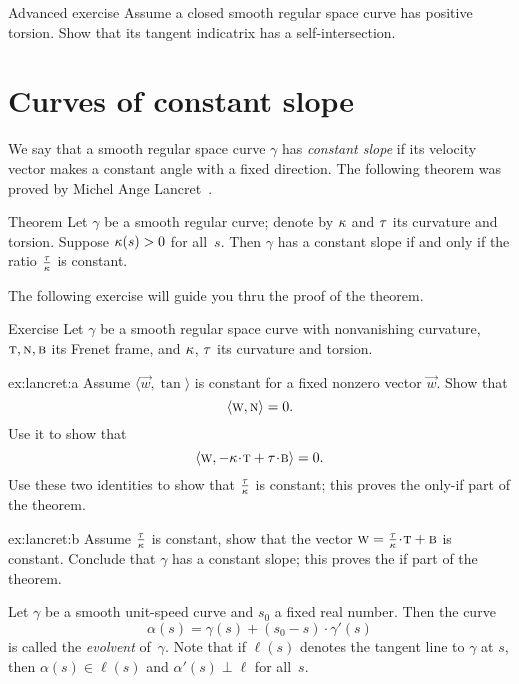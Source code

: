 \begin{thm}{Advanced exercise}\label{ex:torsion-indicatrix}
Assume a closed smooth regular space curve has positive torsion. Show that its tangent indicatrix has a self-intersection.
\end{thm}


\section{Curves of constant slope}

We say that a smooth regular space curve $\gamma$ has \emph{constant slope} if its velocity vector makes a constant angle with a fixed direction.
The following theorem was proved by Michel Ange Lancret~\cite{lancret}.

\begin{thm}{Theorem}\label{thm:const-slope}
Let $\gamma$ be a smooth regular curve;
denote by $\kappa$ and $\tau$ its curvature and torsion.
Suppose $\kappa(s)>0$ for all~$s$.
Then $\gamma$ has a constant slope if and only if the ratio $\tfrac{\tau}{\kappa}$ is constant.
\end{thm}

The following exercise will guide you thru the proof of the theorem. 

\begin{thm}{Exercise}\label{ex:lancret}
Let $\gamma$ be a smooth regular space curve with nonvanishing curvature, $\text{\sc{t}},\text{\sc{n}},\text{\sc{b}}$ 
its Frenet frame, and $\kappa$, $\tau$ its curvature and torsion.


\begin{subthm}{ex:lancret:a}
Assume $\langle \vec w,\tan\rangle$ is constant for a fixed nonzero vector $\vec w$.
Show that 
\[\langle \text{\sc{w}}, \text{\sc{n}}\rangle =0.\]
Use it to show that 
\[\langle \vec w, -\kur\cdot\tan+\tor\cdot \bi\rangle =0.\]
Use these two identities to show that $\tfrac{\tau}{\kappa}$ is constant;
this proves the only-if part of the theorem.
\end{subthm}

\begin{subthm}{ex:lancret:b} Assume $\tfrac{\tau}{\kappa}$ is constant, show that the vector $\vec w=\tfrac\tor\kur\cdot \tan+\bi$ is constant.
Conclude that $\gamma$ has a constant slope; this proves the if part of the theorem.
\end{subthm}

\end{thm}

Let $\gamma$ be a smooth unit-speed curve and $s_0$ a fixed real number. 
Then the curve 
\[\alpha(s)=\gamma(s)+(s_0-s)\cdot \gamma'(s)\]
is called the \emph{evolvent} of~$\gamma$.
Note that if $\ell(s)$ denotes the tangent line to $\gamma$ at $s$,
then $\alpha(s)\in \ell(s)$ and $\alpha'(s)\perp \ell$ for all~$s$.

